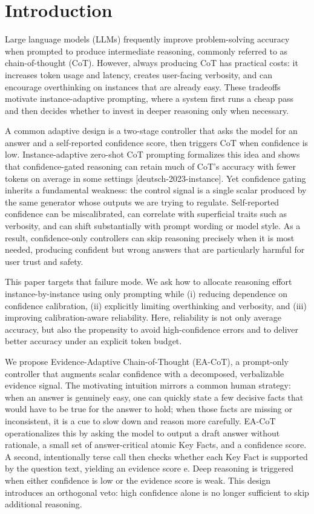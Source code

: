 \documentclass[journal,article,submit,pdftex,moreauthors]{Definitions/mdpi}
\begin{document}
\section{Introduction}

Large language models (LLMs) frequently improve problem-solving accuracy when prompted to produce intermediate reasoning, commonly referred to as chain-of-thought (CoT). However, always producing CoT has practical costs: it increases token usage and latency, creates user-facing verbosity, and can encourage overthinking on instances that are already easy. These tradeoffs motivate instance-adaptive prompting, where a system first runs a cheap pass and then decides whether to invest in deeper reasoning only when necessary.

A common adaptive design is a two-stage controller that asks the model for an answer and a self-reported confidence score, then triggers CoT when confidence is low. Instance-adaptive zero-shot CoT prompting formalizes this idea and shows that confidence-gated reasoning can retain much of CoT’s accuracy with fewer tokens on average in some settings [deutsch-2023-instance]. Yet confidence gating inherits a fundamental weakness: the control signal is a single scalar produced by the same generator whose outputs we are trying to regulate. Self-reported confidence can be miscalibrated, can correlate with superficial traits such as verbosity, and can shift substantially with prompt wording or model style. As a result, confidence-only controllers can skip reasoning precisely when it is most needed, producing confident but wrong answers that are particularly harmful for user trust and safety.

This paper targets that failure mode. We ask how to allocate reasoning effort instance-by-instance using only prompting while (i) reducing dependence on confidence calibration, (ii) explicitly limiting overthinking and verbosity, and (iii) improving calibration-aware reliability. Here, reliability is not only average accuracy, but also the propensity to avoid high-confidence errors and to deliver better accuracy under an explicit token budget.

We propose Evidence-Adaptive Chain-of-Thought (EA-CoT), a prompt-only controller that augments scalar confidence with a decomposed, verbalizable evidence signal. The motivating intuition mirrors a common human strategy: when an answer is genuinely easy, one can quickly state a few decisive facts that would have to be true for the answer to hold; when those facts are missing or inconsistent, it is a cue to slow down and reason more carefully. EA-CoT operationalizes this by asking the model to output a draft answer without rationale, a small set of answer-critical atomic Key Facts, and a confidence score. A second, intentionally terse call then checks whether each Key Fact is supported by the question text, yielding an evidence score e. Deep reasoning is triggered when either confidence is low or the evidence score is weak. This design introduces an orthogonal veto: high confidence alone is no longer sufficient to skip additional reasoning.
\end{document}

